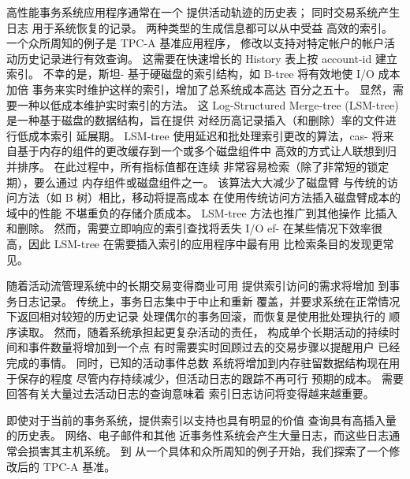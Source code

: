 高性能事务系统应用程序通常在一个
提供活动轨迹的历史表； 同时交易系统产生日志
用于系统恢复的记录。 两种类型的生成信息都可以从中受益
高效的索引。 一个众所周知的例子是 TPC-A 基准应用程序，
修改以支持对特定帐户的帐户活动历史记录进行有效查询。
这需要在快速增长的 History 表上按 account-id 建立索引。 不幸的是，斯坦-
基于硬磁盘的索引结构，如 B-tree 将有效地使 I/O 成本加倍
事务来实时维护这样的索引，增加了总系统成本高达
百分之五十。 显然，需要一种以低成本维护实时索引的方法。 这
Log-Structured Merge-tree (LSM-tree) 是一种基于磁盘的数据结构，旨在提供
对经历高记录插入（和删除）率的文件进行低成本索引
延展期。 LSM-tree 使用延迟和批处理索引更改的算法，cas-
将来自基于内存的组件的更改缓存到一个或多个磁盘组件中
高效的方式让人联想到归并排序。 在此过程中，所有指标值都在连续
非常容易检索（除了非常短的锁定期），要么通过
内存组件或磁盘组件之一。 该算法大大减少了磁盘臂
与传统的访问方法（如 B 树）相比，移动将提高成本
在使用传统访问方法插入磁盘臂成本的域中的性能
不堪重负的存储介质成本。 LSM-tree 方法也推广到其他操作
比插入和删除。 然而，需要立即响应的索引查找将丢失 I/O ef-
在某些情况下效率很高，因此 LSM-tree 在需要插入索引的应用程序中最有用
比检索条目的发现更常见。 

随着活动流管理系统中的长期交易变得商业可用
  提供索引访问的需求将增加
到事务日志记录。 传统上，事务日志集中于中止和重新
覆盖，并要求系统在正常情况下返回相对较短的历史记录
处理偶尔的事务回滚，而恢复是使用批处理执行的
顺序读取。 然而，随着系统承担起更复杂活动的责任，
构成单个长期活动的持续时间和事件数量将增加到一个点
有时需要实时回顾过去的交易步骤以提醒用户
已经完成的事情。 同时，已知的活动事件总数
系统将增加到内存驻留数据结构现在用于保存的程度
尽管内存持续减少，但活动日志的跟踪不再可行
预期的成本。 需要回答有关大量过去活动日志的查询意味着
索引日志访问将变得越来越重要。

即使对于当前的事务系统，提供索引以支持也具有明显的价值
查询具有高插入量的历史表。 网络、电子邮件和其他
近事务性系统会产生大量日志，而这些日志通常会损害其主机系统。 到
从一个具体和众所周知的例子开始，我们探索了一个修改后的 TPC-A 基准。

